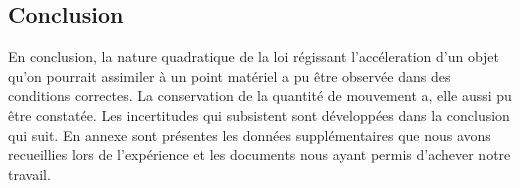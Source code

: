 \subsection{Conclusion}
En conclusion, la nature quadratique de la loi régissant l'accéleration d'un objet qu'on pourrait assimiler à un point matériel a pu être observée dans des conditions correctes.
La conservation de la quantité de mouvement a, elle aussi pu être constatée. Les incertitudes qui subsistent sont développées dans la conclusion qui suit.
En annexe sont présentes les données supplémentaires que nous avons recueillies lors de l'expérience et les documents nous ayant permis d'achever notre travail.
